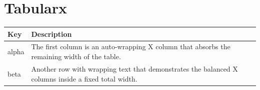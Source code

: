 \documentclass{article}
\begin{document}
\section{Tabularx}
\begin{tabularx}{\textwidth}{lX}
\hline
Key  & Description \\
\hline
alpha & The first column is an auto-wrapping X column that absorbs
the remaining width of the table. \\
beta & Another row with wrapping text that demonstrates the balanced
X columns inside a fixed total width. \\
\hline
\end{tabularx}
\end{document}
